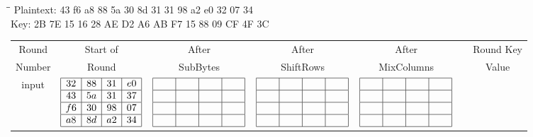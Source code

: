 \begin{tabbing}
  \hspace*{3cm}\=\hspace*{3cm}\= \kill
  Plaintext:  43 f6 a8 88 5a 30 8d 31 31 98 a2 e0 32 07 34 \\
  Key: \> 2B 7E 15 16 28 AE D2 A6 AB F7 15 88 09 CF 4F 3C \\
\end{tabbing}


 \begin{longtable}{c c c c c c c}
     Round  & Start of & After & After & After &  & Round Key \\
     Number & Round & SubBytes & ShiftRows & MixColumns & & Value \\

     input & 
     $\begin{array}{|c|c|c|c|}
       \hline
       32 & 88 & 31 & e0 \\ \hline
       43 & 5a & 31 & 37 \\ \hline
       f6 & 30 & 98 & 07 \\ \hline
       a8 & 8d & a2 & 34 \\ \hline
    \end{array}$ &
    $\begin{array}{|c|c|c|c|}
      \hline
     {\ }{\ }{\ }{\ } & {\ }{\ }{\ }{\ } & {\ }{\ }{\ }{\ } & 
     {\ }{\ }{\ }{\ } \\ \hline
      &  &  &  \\ \hline
      &  &  &  \\ \hline
      &  &  &  \\ \hline
    \end{array}$ &
    $\begin{array}{|c|c|c|c|}
      \hline
     {\ }{\ }{\ }{\ } & {\ }{\ }{\ }{\ } & {\ }{\ }{\ }{\ } & 
     {\ }{\ }{\ }{\ } \\ \hline
      &  &  &  \\ \hline
      &  &  &  \\ \hline
      &  &  &  \\ \hline
    \end{array}$ &
    $\begin{array}{|c|c|c|c|}
      \hline
     {\ }{\ }{\ }{\ } & {\ }{\ }{\ }{\ } & {\ }{\ }{\ }{\ } & 
     {\ }{\ }{\ }{\ } \\ \hline
      &  &  &  \\ \hline
      &  &  &  \\ \hline
      &  &  &  \\ \hline
    \end{array}$ &


\end{longtable}
